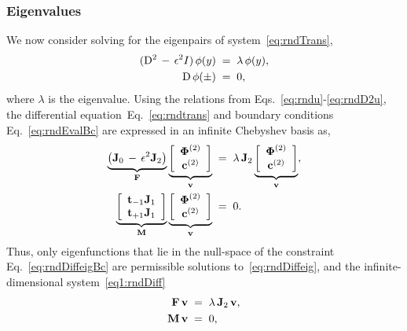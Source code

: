 \documentclass[%
secnumarabic,%
 amssymb, amsmath,%
 aps,prf,superscriptaddress,longbibliography
frontmatterverbose,
]{revtex4-2}
\begin{document}
\subsubsection{Eigenvalues}\label{sec:Eigenvalues}
We now consider solving for the eigenpairs of system~\eqref{eq:rndTrans},
\begin{subequations}\label{eq:rndEig}
  \begin{align}
    (\mathrm D^2  \,-\, \epsilon^2 I)\, \phi (y) \;&=\; \lambda\,\phi (y),
    \label{eq:rndtrans}\\
    \mathrm D\,\phi (\pm)\;&=\;0,\label{eq:rndEvalBc}
  \end{align}   
\end{subequations}
where $\lambda$ is the eigenvalue. Using the relations from Eqs.~\eqref{eq:rndu}-\eqref{eq:rndD2u}, the differential equation~Eq.~\eqref{eq:rndtrans} and boundary conditions Eq.~\eqref{eq:rndEvalBc} are expressed in an infinite Chebyshev basis as,
\begin{subequations}\label{eq1:rndDiff}
\begin{align}
   \underbrace{\left( \mathbf J_0 \, - \, \epsilon^2 \mathbf J_2 \right)}_{\mathbf{F}}
  \underbrace{\left[\begin{array}{c} \boldsymbol \Phi^{(2)} \\ \mathbf c^{(2)}  \end{array}\right] }_{\mathbf{v} }
  \;&=\;  
  \lambda \, \mathbf J_2
\underbrace{\left[\begin{array}{c} \boldsymbol \Phi^{(2)} \\ \mathbf c^{(2)}  \end{array}\right] }_{\mathbf{v}}, \label{eq:rndDiffeig}\\
     \underbrace{ \left[\begin{array}{c}
      \mathbf{t}_{-1}\mathbf J_1\\
      \mathbf{t}_{+1}\mathbf J_1
     \end{array}\right] }_{\mathbf{M}} 
    \underbrace{\left[\begin{array}{c} \boldsymbol \Phi^{(2)} \\ \mathbf c^{(2)}  \end{array}\right] }_{\mathbf{v} }
    \;&=\;  
    0. \label{eq:rndDiffeigBc}
    \end{align}
  \end{subequations}
Thus, only eigenfunctions that lie in the null-space of the constraint Eq.~\eqref{eq:rndDiffeigBc} are permissible solutions to~\eqref{eq:rndDiffeig}, and the infinite-dimensional system~\eqref{eq1:rndDiff}
\begin{subequations}
\begin{align}
  \mathbf{F}\, \mathbf{v} \;&=\; \lambda \, \mathbf{J}_2 \,\mathbf{v},\\
  \mathbf{M} \, \mathbf{v} \;&=\; 0,
\end{align}
\end{subequations}
\end{document}
